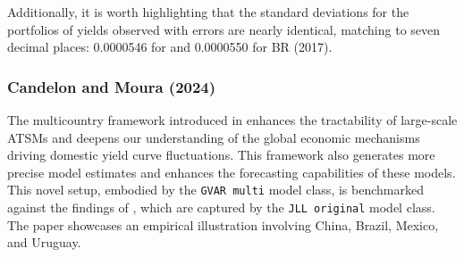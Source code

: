 Additionally, it is worth highlighting that the standard deviations for the portfolios of yields observed with errors are nearly identical, matching to seven decimal places: 0.0000546 for  and 0.0000550 for BR (2017).

\subsubsection{Candelon and Moura (2024)}\label{candelon-and-moura-2024}

The multicountry framework introduced in \citet{CandelonMoura2024} enhances the tractability of large-scale ATSMs and deepens our understanding of the global economic mechanisms driving domestic yield curve fluctuations. This framework also generates more precise model estimates and enhances the forecasting capabilities of these models. This novel setup, embodied by the \texttt{GVAR\ multi} model class, is benchmarked against the findings of \citet{JotikasthiraLeLundblad2015}, which are captured by the \texttt{JLL\ original} model class. The paper showcases an empirical illustration involving China, Brazil, Mexico, and Uruguay.

